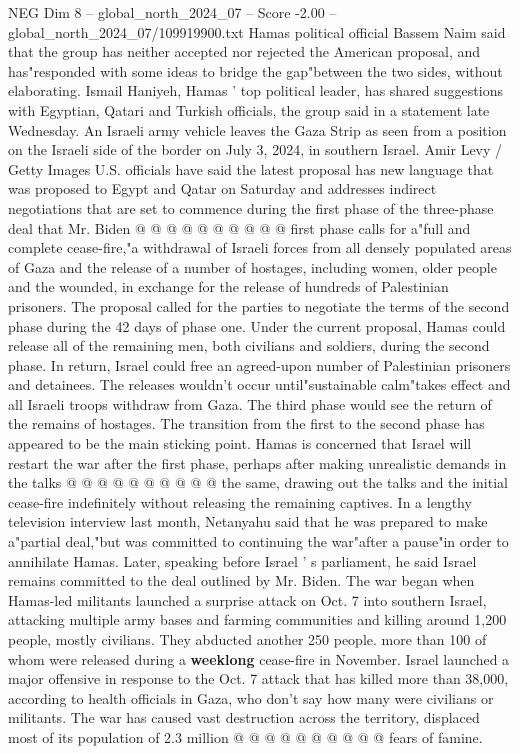 \begin{textsample}{NEG Dim 8 – global\_north\_2024\_07 – Score -2.00 – global\_north\_2024\_07/109919900.txt}
Hamas political official Bassem Naim said that the group has neither accepted nor rejected the American proposal, and has"responded with some ideas to bridge the gap"between the two sides, without elaborating.
Ismail Haniyeh, Hamas ' top political leader, has shared suggestions with Egyptian, Qatari and Turkish officials, the group said in a statement late Wednesday.
An Israeli army vehicle leaves the Gaza Strip as seen from a position on the Israeli side of the border on July 3, 2024, in southern Israel.
Amir Levy / Getty Images U.S. officials have said the latest proposal has new language that was proposed to Egypt and Qatar on Saturday and addresses indirect negotiations that are set to commence during the first phase of the three-phase deal that Mr.
Biden @ @ @ @ @ @ @ @ @ @ first phase calls for a"full and complete cease-fire,"a withdrawal of Israeli forces from all densely populated areas of Gaza and the release of a number of hostages, including women, older people and the wounded, in exchange for the release of hundreds of Palestinian prisoners.
The proposal called for the parties to negotiate the terms of the second phase during the 42 days of phase one.
Under the current proposal, Hamas could release all of the remaining men, both civilians and soldiers, during the second phase.
In return, Israel could free an agreed-upon number of Palestinian prisoners and detainees.
The releases wouldn't occur until"sustainable calm"takes effect and all Israeli troops withdraw from Gaza.
The third phase would see the return of the remains of hostages.
The transition from the first to the second phase has appeared to be the main sticking point.
Hamas is concerned that Israel will restart the war after the first phase, perhaps after making unrealistic demands in the talks @ @ @ @ @ @ @ @ @ @ the same, drawing out the talks and the initial cease-fire indefinitely without releasing the remaining captives.
In a lengthy television interview last month, Netanyahu said that he was prepared to make a"partial deal,"but was committed to continuing the war"after a pause"in order to annihilate Hamas.
Later, speaking before Israel ' s parliament, he said Israel remains committed to the deal outlined by Mr.
Biden.
The war began when Hamas-led militants launched a surprise attack on Oct. 7 into southern Israel, attacking multiple army bases and farming communities and killing around 1,200 people, mostly civilians.
They abducted another 250 people. more than 100 of whom were released during a \textbf{weeklong} cease-fire in November.
Israel launched a major offensive in response to the Oct. 7 attack that has killed more than 38,000, according to health officials in Gaza, who don't say how many were civilians or militants.
The war has caused vast destruction across the territory, displaced most of its population of 2.3 million @ @ @ @ @ @ @ @ @ @ fears of famine.

\end{textsample}
